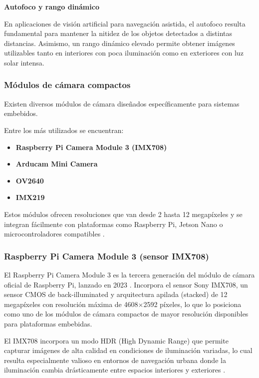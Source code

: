 \textbf{Autofoco y rango dinámico}

En aplicaciones de visión artificial para navegación asistida, el autofoco resulta fundamental para mantener la nitidez de los objetos detectados a distintas distancias. Asimismo, un rango dinámico elevado permite obtener imágenes utilizables tanto en interiores con poca iluminación como en exteriores con luz solar intensa.

\subsubsection{Módulos de cámara compactos}

Existen diversos módulos de cámara diseñados específicamente para sistemas embebidos.

Entre los más utilizados se encuentran:

\begin{itemize}
\item \textbf{Raspberry Pi Camera Module 3 (IMX708)} \cite{raspberrypi_camera_doc3}
\item \textbf{Arducam Mini Camera} \cite{arducam_imx219}
\item \textbf{OV2640} \cite{ov2640_datasheet}
\item \textbf{IMX219} \cite{arducam_imx219}
\end{itemize}

Estos módulos ofrecen resoluciones que van desde 2 hasta 12 megapíxeles y se integran fácilmente con plataformas como Raspberry Pi, Jetson Nano o microcontroladores compatibles \cite{raspberrypi_camera_doc, arducam_imx219}.

\subsubsection{Raspberry Pi Camera Module 3 (sensor IMX708)}

El Raspberry Pi Camera Module 3 es la tercera generación del módulo de cámara oficial de Raspberry Pi, lanzado en 2023 \cite{raspberrypi_camera_doc}. Incorpora el sensor Sony IMX708, un sensor CMOS de back-illuminated y arquitectura apilada (stacked) de 12 megapíxeles con resolución máxima de 4608$\times$2592 píxeles, lo que lo posiciona como uno de los módulos de cámara compactos de mayor resolución disponibles para plataformas embebidas.

El IMX708 incorpora un modo HDR (High Dynamic Range) que permite capturar imágenes de alta calidad en condiciones de iluminación variadas, lo cual resulta especialmente valioso en entornos de navegación urbana donde la iluminación cambia drásticamente entre espacios interiores y exteriores \cite{raspberrypi_camera_doc3}.

